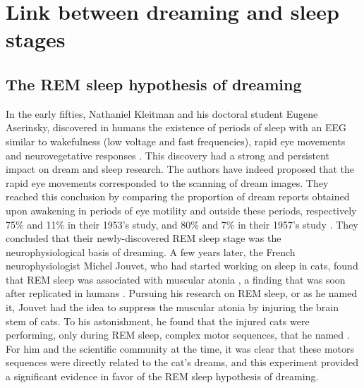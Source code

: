 \section{Link between dreaming and sleep stages}
\label{sec:dream-research:link}

\subsection{The REM sleep hypothesis of dreaming}
\label{sec:dream-research:link:rem-sleep}

In the early fifties, Nathaniel Kleitman and his doctoral student Eugene Aserinsky, discovered in humans the existence of periods of sleep with an EEG similar to wakefulness (low voltage and fast frequencies), rapid eye movements and neurovegetative responses \citep{aserinsky_regularly_1953}. This discovery had a strong and persistent impact on dream and sleep research. The authors have indeed proposed that the rapid eye movements corresponded to the scanning of dream images. They reached this conclusion by comparing the proportion of dream reports obtained upon awakening in periods of eye motility and outside these periods, respectively 75\% and 11\% in their 1953’s study, and 80\% and 7\% in their 1957's study \citep{dement_relation_1957}. They concluded that their newly-discovered REM sleep stage was the neurophysiological basis of dreaming. A few years later, the French neurophysiologist Michel Jouvet, who had started working on sleep in cats, found that REM sleep was associated with muscular atonia \citep{jouvet_sur_1959}, a finding that was soon after replicated in humans \citep{berger_tonus_1961}. Pursuing his research on REM sleep, or  as he named it, Jouvet had the idea to suppress the muscular atonia by injuring the brain stem of cats. To his astonishment, he found that the injured cats were performing, only during REM sleep, complex motor sequences, that he named  \citep{sastre_comportement_1979}. For him and the scientific community at the time, it was clear that these motors sequences were directly related to the cat's dreams, and this experiment provided a significant evidence in favor of the REM sleep hypothesis of dreaming.

